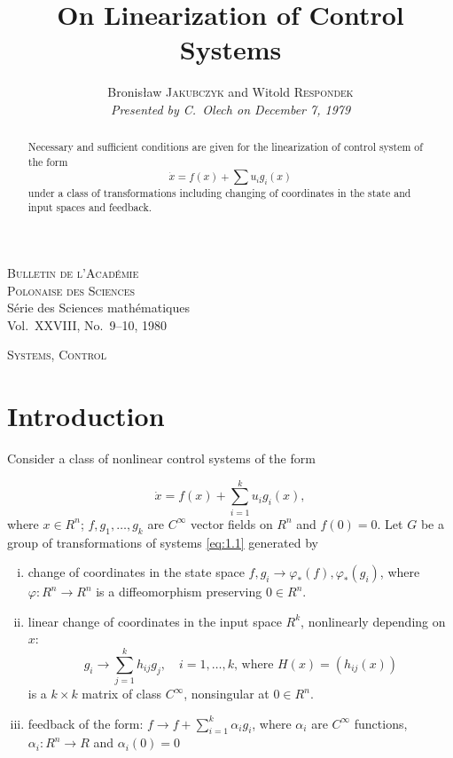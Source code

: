 \documentclass[leqno]{article}
\title{On Linearization of Control Systems}
\author{Bronisław \textsc{Jakubczyk} and Witold \textsc{Respondek}\\
	\emph{Presented by C.\ Olech on December 7, 1979}}
\date{}
\theoremstyle{plain}
\numberwithin{equation}{section}
\begin{document}
	
\noindent	
\textsc{Bulletin de l'Académie} \\
\textsc{Polonaise des Sciences} \\
Série des Sciences mathématiques \\
Vol.\ XXVIII, No.\ 9--10, 1980

\mbox{}\hfill \textsc{Systems, Control}

{\let\newpage\relax\maketitle}

\maketitle

\renewcommand*\abstractname{Summary.}
	
\begin{abstract}
	Necessary and sufficient conditions are given for the linearization of control system
	of the form	
	\begin{equation*}
		\dot{x}=f(x)+\sum u_{i} g_{i}(x)
	\end{equation*}
	under a class of transformations including changing of coordinates in the state and input spaces and feedback.
\end{abstract}
	
\section{Introduction}

 Consider a class of nonlinear control systems of the form

\begin{equation} \label{eq:1.1}
	\dot{x}=f(x)+\sum_{i=1}^{k} u_{i} g_{i}(x),
\end{equation}
where $x \in R^{n}$; $f, g_{1}, \ldots, g_{k}$ are $C^{\infty}$ vector fields on $R^{n}$ and $f(0)=0$. Let $G$ be a group of transformations of systems \eqref{eq:1.1} generated by
\begin{enumerate}[(i)]
	\item \label{i} change of coordinates in the state space $f, g_{i} \rightarrow \varphi_{*}(f), \varphi_{*}\left(g_{i}\right)$, where $\varphi: R^{n} \rightarrow R^{n}$ is a diffeomorphism preserving $0 \in R^{n}$.
	\item \label{ii} linear change of coordinates in the input space $R^{k}$, nonlinearly depending on $x$:
	\begin{equation*}
		g_{i} \rightarrow \sum_{j=1}^{k} h_{i j} g_{j}, \quad i=1, \ldots, k \text {, where } H(x)=\left(h_{i j}(x)\right)
	\end{equation*}
	is a $k \times k$ matrix of class $C^{\infty}$, nonsingular at $0 \in R^{n}$.
	\item \label{iii} feedback of the form: $f \rightarrow f+\sum_{i=1}^{k} \alpha_{i} g_{i}$, where $\alpha_{i}$ are $C^{\infty}$ functions, $\alpha_i: R^{n} \rightarrow R$ and $\alpha_{i}(0)=0$
\end{enumerate}
\end{document}
